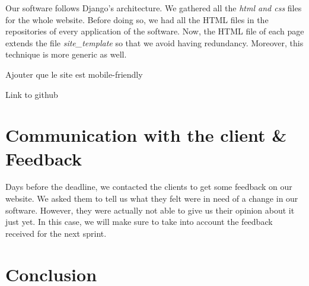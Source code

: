 \documentclass[a4paper, 12pt]{article}
\begin{document}
Our software follows Django's architecture. We gathered all the \textit{html and css} files for the whole website. Before doing so, we had all the HTML files in the repositories of every application of the software. Now, the HTML file of each page extends the file \textit{site\_template} so that we avoid having redundancy. Moreover, this technique is more generic as well. 


Ajouter que le site est mobile-friendly 


Link to github

\section{Communication with the client \& Feedback}
Days before the deadline, we contacted the clients to get some feedback on our website. We asked them to tell us what they felt were in need of a change in our software. However, they were actually not able to give us their opinion about it just yet. In this case, we will make sure to take into account the feedback received for the next sprint. \\

\section{Conclusion}
\end{document}

